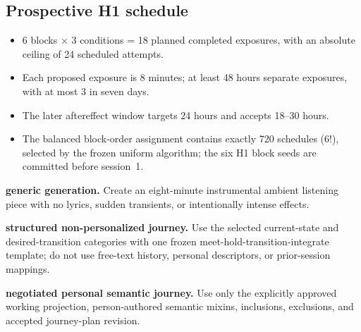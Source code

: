 \subsection*{Prospective H1 schedule}
\begin{itemize}[leftmargin=1.35em,itemsep=0.4em]
  \item 6 blocks $\times$ 3 conditions = 18 planned completed exposures, with an absolute ceiling of 24 scheduled attempts.
  \item Each proposed exposure is 8 minutes; at least 48 hours separate exposures, with at most 3 in seven days.
  \item The later aftereffect window targets 24 hours and accepts 18--30 hours.
  \item The balanced block-order assignment contains exactly 720 schedules ($6!$), selected by the frozen uniform algorithm; the six H1 block seeds are committed before session~1.
\end{itemize}

\begin{description}[leftmargin=2.8em,style=nextline,itemsep=0.45em]
  \item[\texttt{G}] \textbf{generic generation.} Create an eight-minute instrumental ambient listening piece with no lyrics, sudden transients, or intentionally intense effects.
  \item[\texttt{S}] \textbf{structured non-personalized journey.} Use the selected current-state and desired-transition categories with one frozen meet-hold-transition-integrate template; do not use free-text history, personal descriptors, or prior-session mappings.
  \item[\texttt{P}] \textbf{negotiated personal semantic journey.} Use only the explicitly approved working projection, person-authored semantic mixins, inclusions, exclusions, and accepted journey-plan revision.
\end{description}

